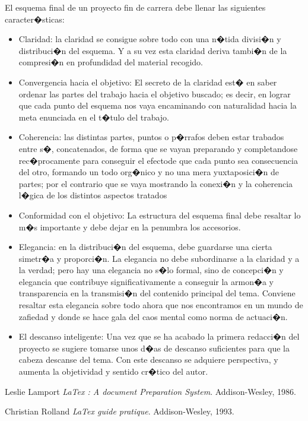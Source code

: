 \documentclass[12pt,letter,spanish]{book}
\begin{document}
El esquema final de un proyecto fin de carrera debe llenar las siguientes caracter�sticas:

\begin{itemize}
\item   Claridad: la claridad se consigue sobre todo con una n�tida divisi�n y distribuci�n del esquema. Y a su vez esta
        claridad deriva tambi�n de la compresi�n en profundidad del material recogido.
\item   Convergencia hacia el objetivo: El secreto de la claridad est� en saber ordenar las partes del trabajo hacia el
        objetivo buscado; es decir, en lograr que cada punto del esquema nos vaya encaminando con naturalidad hacia la meta
        enunciada en el t�tulo del trabajo.
\item   Coherencia: las distintas partes, puntos o p�rrafos deben estar trabados entre s�, concatenados, de forma que se
        vayan preparando y completandose rec�procamente para conseguir el efectode que cada punto sea consecuencia del otro,
        formando un todo org�nico y no una mera yuxtaposici�n de partes; por el contrario que se vaya mostrando la conexi�n
        y la coherencia l�gica de los distintos aspectos tratados
\item   Conformidad con el objetivo: La estructura del esquema final debe resaltar lo m�s importante y debe dejar en la
        penumbra los accesorios.
\item   Elegancia: en la distribuci�n del esquema, debe guardarse una cierta simetr�a y proporci�n. La elegancia no debe
        subordinarse a la claridad y a la verdad; pero hay una elegancia no s�lo formal, sino de concepci�n y elegancia
        que contribuye significativamente a conseguir la armon�a y transparencia en la transmisi�n del contenido principal
        del tema. Conviene resaltar esta elegancia sobre todo ahora que nos encontramos en un mundo de zafiedad y donde se
        hace gala del caos mental como norma de actuaci�n.
\item   El descanso inteligente: Una vez que se ha acabado la primera redacci�n del proyecto se sugiere tomarse unos
        d�as de descanso suficientes para que la cabeza descanse del tema. Con este descanso se adquiere perspectiva,
        y aumenta la objetividad y sentido cr�tico del autor.
\end{itemize}



\begin{thebibliography}{1}

 Leslie Lamport {\em LaTex : A document Preparation System}. Addison-Wesley, 1986.

 Christian Rolland {\em LaTex guide pratique}. Addison-Wesley, 1993.

\end{thebibliography}


\end{document}
